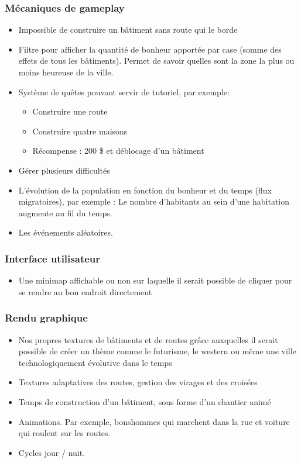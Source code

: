 \documentclass[a4paper,10pt,openany,oneside]{report}
\begin{document}
\subsubsection{Mécaniques de gameplay}
\begin{itemize}
	\item Impossible de construire un bâtiment sans route qui le borde
	\item Filtre pour afficher la quantité de bonheur apportée par case (somme des effets de tous les bâtiments). Permet de savoir quelles sont la zone la plus ou moins heureuse de la ville.
	\item Système de quêtes pouvant servir de tutoriel, par exemple:
	\begin{itemize}
		\item Construire une route
		\item Construire quatre maisons
		\item Récompense : 200 \$ et déblocage d'un bâtiment
	\end{itemize}
	\item Gérer plusieurs difficultés
	\item L'évolution de la population en fonction du bonheur et du temps (flux migratoires), par exemple : Le nombre d'habitants au sein d'une habitation augmente au fil du temps.
	\item Les événements aléatoires.
\end{itemize}

\subsubsection{Interface utilisateur}
\begin{itemize}
\item Une minimap affichable ou non sur laquelle il serait possible de cliquer pour se rendre au bon endroit directement
\end{itemize}

\subsubsection{Rendu graphique}
\begin{itemize}
\item Nos propres textures de bâtiments et de routes grâce auxquelles il serait possible de créer un thème comme le futurisme, le western ou même une ville technologiquement évolutive dans le temps
\item Textures adaptatives des routes, gestion des virages et des croisées
\item Temps de construction d'un bâtiment, sous forme d'un chantier animé
\item Animations. Par exemple, bonshommes qui marchent dans la rue et voiture qui roulent sur les routes.
\item Cycles jour / nuit.
\end{itemize}
\end{document}
